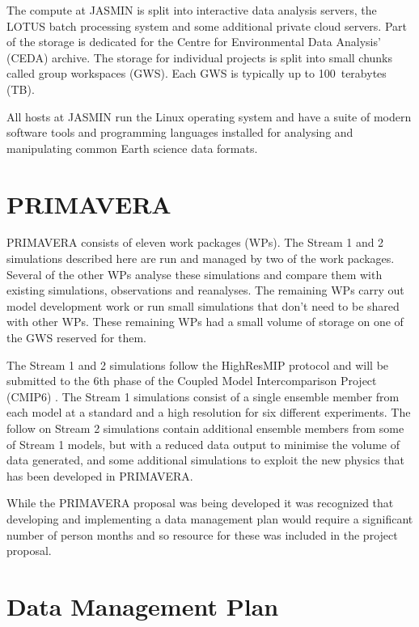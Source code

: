 \documentclass[gmd, manuscript]{copernicus}
\begin{document}
The compute at JASMIN is split into interactive data analysis servers, the LOTUS batch processing system and some additional private cloud servers. Part of the storage is dedicated for the Centre for Environmental Data Analysis' (CEDA) archive. The storage for individual projects is split into small chunks called group workspaces (GWS). Each GWS is typically up to 100~terabytes (TB).

All hosts at JASMIN run the Linux operating system and have a suite of modern software tools and programming languages installed for analysing and manipulating common Earth science data formats.

\section{PRIMAVERA}

PRIMAVERA consists of eleven work packages (WPs). The Stream 1 and 2 simulations described here are run and managed by two of the work packages. Several of the other WPs analyse these simulations and compare them with existing simulations, observations and reanalyses. The remaining WPs carry out model development work or run small simulations that don't need to be shared with other WPs. These remaining WPs had a small volume of storage on one of the GWS reserved for them.

The Stream 1 and 2 simulations follow the HighResMIP protocol and will be submitted to the 6th phase of the Coupled Model Intercomparison Project (CMIP6) \citep{Eyring2016}. The Stream 1 simulations consist of a single ensemble member from each model at a standard and a high resolution for six different experiments. The follow on Stream 2 simulations contain additional ensemble members from some of Stream 1 models, but with a reduced data output to minimise the volume of data generated, and some additional simulations to exploit the new physics that has been developed in PRIMAVERA.

While the PRIMAVERA proposal was being developed it was recognized that developing and implementing a data management plan would require a significant number of person months and so resource for these was included in the project proposal.


\section{Data Management Plan}
\end{document}
